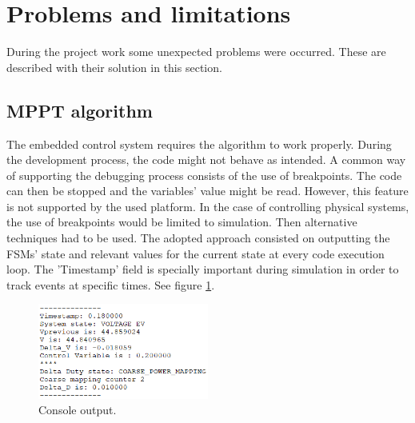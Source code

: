 \section{Problems and limitations}

During the project work some unexpected problems were occurred. These are described  with their solution in this section.











\subsection{MPPT algorithm}
The embedded control system requires the algorithm to work properly. During the development process, the code might not behave as intended. A common way of supporting the debugging process consists of the use of breakpoints. 
The code can then be stopped and the variables' value might be read. However, this feature is not supported by the used platform. In the case of controlling physical systems, the use of breakpoints would be limited to simulation. Then alternative techniques had to be used. 
The adopted approach consisted on outputting the FSMs' state and relevant values for the current state at every code execution loop. 
The 'Timestamp' field is specially important during simulation in order to track events at specific times. See figure \ref{console_output}.

\begin{figure}[htbp]
	\begin{center}
		\includegraphics[width=0.5\textwidth]{../Pictures/P1/Discussion/console_output.png}
		\caption{Console output.}
		\label{console_output}
	\end{center}	
\end{figure}

